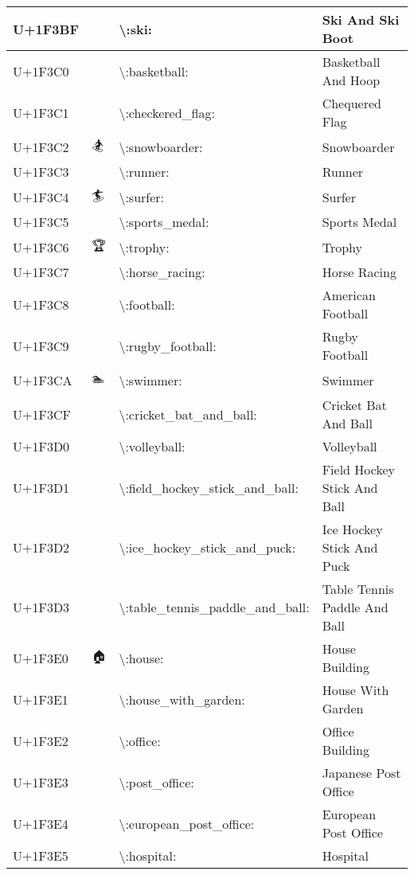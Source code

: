 \begin{table}[h]
\begin{tabulary}{\linewidth}{|L|L|L|L|}
\hline
U+1F3BF & 🎿 & {\textbackslash}:ski: & Ski And Ski Boot \\
\hline
U+1F3C0 & 🏀 & {\textbackslash}:basketball: & Basketball And Hoop \\
\hline
U+1F3C1 & 🏁 & {\textbackslash}:checkered\_flag: & Chequered Flag \\
\hline
U+1F3C2 & 🏂 & {\textbackslash}:snowboarder: & Snowboarder \\
\hline
U+1F3C3 & 🏃 & {\textbackslash}:runner: & Runner \\
\hline
U+1F3C4 & 🏄 & {\textbackslash}:surfer: & Surfer \\
\hline
U+1F3C5 & 🏅 & {\textbackslash}:sports\_medal: & Sports Medal \\
\hline
U+1F3C6 & 🏆 & {\textbackslash}:trophy: & Trophy \\
\hline
U+1F3C7 & 🏇 & {\textbackslash}:horse\_racing: & Horse Racing \\
\hline
U+1F3C8 & 🏈 & {\textbackslash}:football: & American Football \\
\hline
U+1F3C9 & 🏉 & {\textbackslash}:rugby\_football: & Rugby Football \\
\hline
U+1F3CA & 🏊 & {\textbackslash}:swimmer: & Swimmer \\
\hline
U+1F3CF & 🏏 & {\textbackslash}:cricket\_bat\_and\_ball: & Cricket Bat And Ball \\
\hline
U+1F3D0 & 🏐 & {\textbackslash}:volleyball: & Volleyball \\
\hline
U+1F3D1 & 🏑 & {\textbackslash}:field\_hockey\_stick\_and\_ball: & Field Hockey Stick And Ball \\
\hline
U+1F3D2 & 🏒 & {\textbackslash}:ice\_hockey\_stick\_and\_puck: & Ice Hockey Stick And Puck \\
\hline
U+1F3D3 & 🏓 & {\textbackslash}:table\_tennis\_paddle\_and\_ball: & Table Tennis Paddle And Ball \\
\hline
U+1F3E0 & 🏠 & {\textbackslash}:house: & House Building \\
\hline
U+1F3E1 & 🏡 & {\textbackslash}:house\_with\_garden: & House With Garden \\
\hline
U+1F3E2 & 🏢 & {\textbackslash}:office: & Office Building \\
\hline
U+1F3E3 & 🏣 & {\textbackslash}:post\_office: & Japanese Post Office \\
\hline
U+1F3E4 & 🏤 & {\textbackslash}:european\_post\_office: & European Post Office \\
\hline
U+1F3E5 & 🏥 & {\textbackslash}:hospital: & Hospital \\

\end{tabulary}
\end{table}
